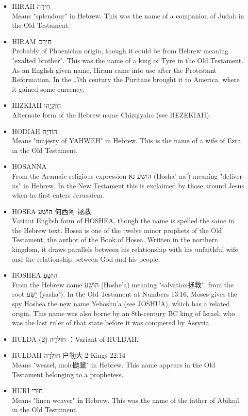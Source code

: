 \begin{itemize}
Derived from Hebrew הָלַל (halal) meaning "praise". This name is mentioned briefly in the Old Testament as the father of the judge Abdon. It was also borne by the 1st-century BC Jewish scholar Hillel the Elder.
\item HIRAH חִירָה \\
Means "splendour" in Hebrew. This was the name of a companion of Judah in the Old Testament.
\item HIRAM חִירָם \\
Probably of Phoenician origin, though it could be from Hebrew meaning "exalted brother". This was the name of a king of Tyre in the Old Testament. As an English given name, Hiram came into use after the Protestant Reformation. In the 17th century the Puritans brought it to America, where it gained some currency.
\item HIZKIAH חִזְקִיָהוּ \\
Alternate form of the Hebrew name Chizqiyahu (see HEZEKIAH).
\item HODIAH הוֹדִיָה \\
Means "majesty of YAHWEH" in Hebrew. This is the name of a wife of Ezra in the Old Testament.
\item HOSANNA \\
From the Aramaic religious expression הושע נא (Hosha' na') meaning "deliver us" in Hebrew. In the New Testament this is exclaimed by those around Jesus when he first enters Jerusalem.
\item HOSEA הוֹשֵׁעַ 何西阿 拯救\\
Variant English form of HOSHEA, though the name is spelled the same in the Hebrew text. Hosea is one of the twelve minor prophets of the Old Testament, the author of the Book of Hosea. Written in the northern kingdom, it draws parallels between his relationship with his unfaithful wife and the relationship between God and his people.
\item HOSHEA הוֹשֵׁעַ \\
From the Hebrew name הוֹשֵׁעַ (Hoshe'a) meaning "salvation拯救", from the root יָשַׁע (yasha'). In the Old Testament at Numbers 13:16, Moses gives the spy Hoshea the new name Yehoshu'a (see JOSHUA), which has a related origin. This name was also borne by an 8th-century BC king of Israel, who was the last ruler of that state before it was conquered by Assyria.
\item HULDA (2) חוּלְדָה ：Variant of HULDAH.
\item HULDAH חוּלְדָה 户勒大 2 Kings 22:14\\
Means "weasel, mole鼬鼠" in Hebrew. This name appears in the Old Testament belonging to a prophetess.
\item HURI חוּרִי \\
Means "linen weaver" in Hebrew. This was the name of the father of Abihail in the Old Testament.
\end{itemize} 

